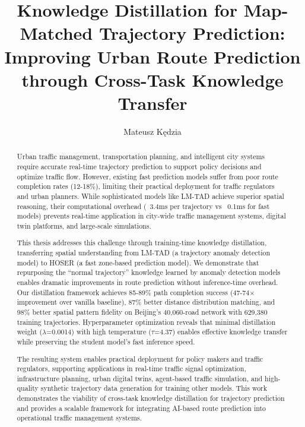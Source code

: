 \documentclass[runningheads]{llncs}
\begin{document}

\title{Knowledge Distillation for Map-Matched Trajectory Prediction: Improving Urban Route Prediction through Cross-Task Knowledge Transfer}
\author{Mateusz K{\k e}dzia}
\maketitle

\begin{abstract}
  Urban traffic management, transportation planning, and intelligent city systems require accurate real-time trajectory prediction to support policy decisions and optimize traffic flow. However, existing fast prediction models suffer from poor route completion rates (12-18\%), limiting their practical deployment for traffic regulators and urban planners. While sophisticated models like LM-TAD achieve superior spatial reasoning, their computational overhead (~3.4ms per trajectory vs ~0.1ms for fast models) prevents real-time application in city-wide traffic management systems, digital twin platforms, and large-scale simulations.

  This thesis addresses this challenge through training-time knowledge distillation, transferring spatial understanding from LM-TAD (a trajectory anomaly detection model) to HOSER (a fast zone-based prediction model). We demonstrate that repurposing the ``normal trajectory'' knowledge learned by anomaly detection models enables dramatic improvements in route prediction without inference-time overhead. Our distillation framework achieves 85-89\% path completion success (47-74$\times$ improvement over vanilla baseline), 87\% better distance distribution matching, and 98\% better spatial pattern fidelity on Beijing's 40,060-road network with 629,380 training trajectories. Hyperparameter optimization reveals that minimal distillation weight ($\lambda$=0.0014) with high temperature ($\tau$=4.37) enables effective knowledge transfer while preserving the student model's fast inference speed.

  The resulting system enables practical deployment for policy makers and traffic regulators, supporting applications in real-time traffic signal optimization, infrastructure planning, urban digital twins, agent-based traffic simulation, and high-quality synthetic trajectory data generation for training other models. This work demonstrates the viability of cross-task knowledge distillation for trajectory prediction and provides a scalable framework for integrating AI-based route prediction into operational traffic management systems.

\end{abstract}
\end{document}

